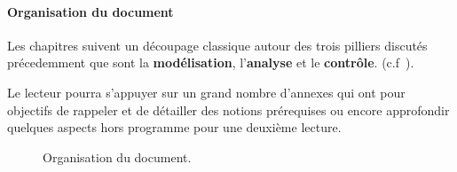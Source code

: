 \paragraph{Organisation du document}

Les chapitres suivent un découpage classique                                                            
autour des trois pilliers discutés précedemment que sont la 
\textbf{modélisation}, l'\textbf{analyse} et le \textbf{contrôle}.
(c.f~).

Le lecteur pourra s'appuyer sur un grand nombre d'annexes 
qui ont pour objectifs de rappeler et de détailler 
des notions prérequises ou encore approfondir quelques aspects 
hors programme pour une deuxième lecture.  

\begin{figure}[!h]
\renewcommand\thefigure{A}
\begin{center}
{
\tikzset{external/export=false}

}
\end{center}
\caption{Organisation du document.\label{fig-diagramme_cours}}
\end{figure}
